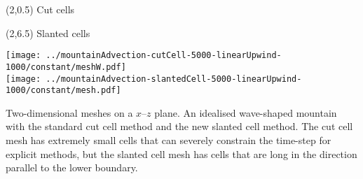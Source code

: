 \documentclass{article}
\begin{document}
\TPMargin{2pt}
\begin{textblock}{2}(2,0.5)
\normalsize
Cut cells
\end{textblock}
\begin{textblock}{2.5}(2,6.5)
\normalsize
Slanted cells
\end{textblock}
\begin{center}
\texttt{[image: ../mountainAdvection-cutCell-5000-linearUpwind-1000/constant/meshW.pdf]} \\
\hspace*{0.8em}\texttt{[image: ../mountainAdvection-slantedCell-5000-linearUpwind-1000/constant/mesh.pdf]}
\end{center}
Two-dimensional meshes on a $x$--$z$ plane.  An idealised wave-shaped mountain with the standard cut cell method and the new slanted cell method.  The cut cell mesh has extremely small cells that can severely constrain the time-step for explicit methods, but the slanted cell mesh has cells that are long in the direction parallel to the lower boundary.
\end{document}
